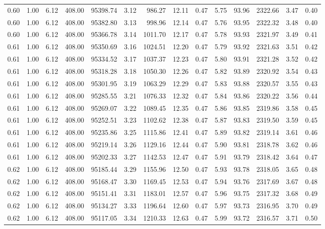 \begin{table}[!ht]
\begin{tabular}{rrrrrrrrrrrrrr}
0.60 & 1.00 & 6.12 & 408.00 & 95398.74 & 3.12 & 986.27 & 12.11 & 0.47 & 5.75 & 93.96 & 2322.66 & 3.47 & 0.40 \\
0.60 & 1.00 & 6.12 & 408.00 & 95382.80 & 3.13 & 998.96 & 12.14 & 0.47 & 5.76 & 93.95 & 2322.32 & 3.48 & 0.40 \\
0.60 & 1.00 & 6.12 & 408.00 & 95366.78 & 3.14 & 1011.70 & 12.17 & 0.47 & 5.78 & 93.93 & 2321.97 & 3.49 & 0.41 \\
0.61 & 1.00 & 6.12 & 408.00 & 95350.69 & 3.16 & 1024.51 & 12.20 & 0.47 & 5.79 & 93.92 & 2321.63 & 3.51 & 0.42 \\
0.61 & 1.00 & 6.12 & 408.00 & 95334.52 & 3.17 & 1037.37 & 12.23 & 0.47 & 5.80 & 93.91 & 2321.28 & 3.52 & 0.42 \\
0.61 & 1.00 & 6.12 & 408.00 & 95318.28 & 3.18 & 1050.30 & 12.26 & 0.47 & 5.82 & 93.89 & 2320.92 & 3.54 & 0.43 \\
0.61 & 1.00 & 6.12 & 408.00 & 95301.95 & 3.19 & 1063.29 & 12.29 & 0.47 & 5.83 & 93.88 & 2320.57 & 3.55 & 0.43 \\
0.61 & 1.00 & 6.12 & 408.00 & 95285.55 & 3.21 & 1076.33 & 12.32 & 0.47 & 5.84 & 93.86 & 2320.22 & 3.56 & 0.44 \\
0.61 & 1.00 & 6.12 & 408.00 & 95269.07 & 3.22 & 1089.45 & 12.35 & 0.47 & 5.86 & 93.85 & 2319.86 & 3.58 & 0.45 \\
0.61 & 1.00 & 6.12 & 408.00 & 95252.51 & 3.23 & 1102.62 & 12.38 & 0.47 & 5.87 & 93.83 & 2319.50 & 3.59 & 0.45 \\
0.61 & 1.00 & 6.12 & 408.00 & 95235.86 & 3.25 & 1115.86 & 12.41 & 0.47 & 5.89 & 93.82 & 2319.14 & 3.61 & 0.46 \\
0.61 & 1.00 & 6.12 & 408.00 & 95219.14 & 3.26 & 1129.16 & 12.44 & 0.47 & 5.90 & 93.81 & 2318.78 & 3.62 & 0.46 \\
0.61 & 1.00 & 6.12 & 408.00 & 95202.33 & 3.27 & 1142.53 & 12.47 & 0.47 & 5.91 & 93.79 & 2318.42 & 3.64 & 0.47 \\
0.62 & 1.00 & 6.12 & 408.00 & 95185.44 & 3.29 & 1155.96 & 12.50 & 0.47 & 5.93 & 93.78 & 2318.05 & 3.65 & 0.48 \\
0.62 & 1.00 & 6.12 & 408.00 & 95168.47 & 3.30 & 1169.45 & 12.53 & 0.47 & 5.94 & 93.76 & 2317.69 & 3.67 & 0.48 \\
0.62 & 1.00 & 6.12 & 408.00 & 95151.41 & 3.31 & 1183.01 & 12.57 & 0.47 & 5.96 & 93.75 & 2317.32 & 3.68 & 0.49 \\
0.62 & 1.00 & 6.12 & 408.00 & 95134.27 & 3.33 & 1196.64 & 12.60 & 0.47 & 5.97 & 93.73 & 2316.95 & 3.70 & 0.49 \\
0.62 & 1.00 & 6.12 & 408.00 & 95117.05 & 3.34 & 1210.33 & 12.63 & 0.47 & 5.99 & 93.72 & 2316.57 & 3.71 & 0.50 \\

\end{tabular}
\end{table}
